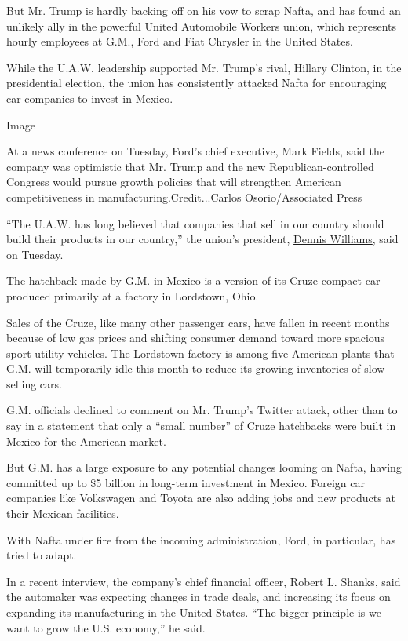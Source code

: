 But Mr. Trump is hardly backing off on his vow to scrap Nafta, and has
found an unlikely ally in the powerful United Automobile Workers union,
which represents hourly employees at G.M., Ford and Fiat Chrysler in the
United States.

While the U.A.W. leadership supported Mr. Trump's rival, Hillary
Clinton, in the presidential election, the union has consistently
attacked Nafta for encouraging car companies to invest in Mexico.

Image

At a news conference on Tuesday, Ford's chief executive, Mark Fields,
said the company was optimistic that Mr. Trump and the new
Republican-controlled Congress would pursue growth policies that will
strengthen American competitiveness in manufacturing.Credit...Carlos
Osorio/Associated Press

``The U.A.W. has long believed that companies that sell in our country
should build their products in our country,'' the union's president,
\href{https://uaw.org/executive-board/uaw-president-dennis-williams/}{Dennis
Williams}, said on Tuesday.

The hatchback made by G.M. in Mexico is a version of its Cruze compact
car produced primarily at a factory in Lordstown, Ohio.

Sales of the Cruze, like many other passenger cars, have fallen in
recent months because of low gas prices and shifting consumer demand
toward more spacious sport utility vehicles. The Lordstown factory is
among five American plants that G.M. will temporarily idle this month to
reduce its growing inventories of slow-selling cars.

G.M. officials declined to comment on Mr. Trump's Twitter attack, other
than to say in a statement that only a ``small number'' of Cruze
hatchbacks were built in Mexico for the American market.

But G.M. has a large exposure to any potential changes looming on Nafta,
having committed up to \$5 billion in long-term investment in Mexico.
Foreign car companies like Volkswagen and Toyota are also adding jobs
and new products at their Mexican facilities.

With Nafta under fire from the incoming administration, Ford, in
particular, has tried to adapt.

In a recent interview, the company's chief financial officer, Robert L.
Shanks, said the automaker was expecting changes in trade deals, and
increasing its focus on expanding its manufacturing in the United
States. ``The bigger principle is we want to grow the U.S. economy,'' he
said.

